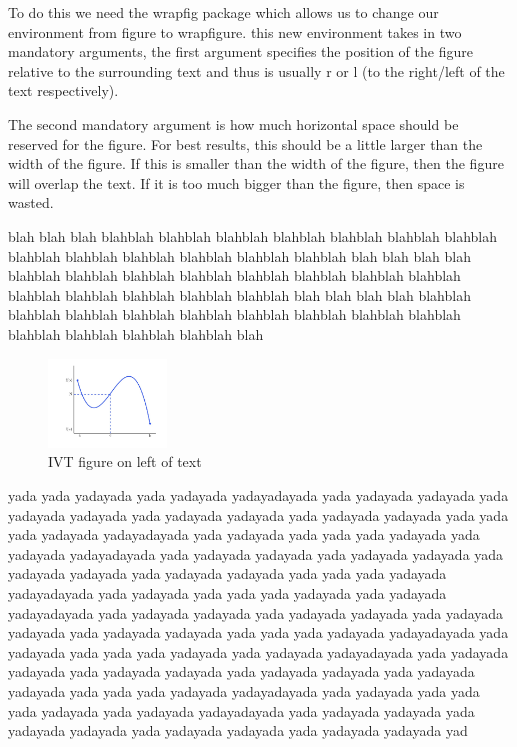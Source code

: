 \documentclass[a4paper,11pt]{article}
\begin{document}
To do this we need the wrapfig package  which allows us to change our environment from figure to wrapfigure. this new environment takes in two mandatory arguments, the first argument specifies the position of the figure relative to the surrounding text and thus is usually r or l (to the right/left of the text respectively).

The second mandatory argument is how much horizontal space should be reserved for the figure. For best results, this should be a little larger than the width of the figure. If this is smaller than the width of the figure, then the figure will overlap the text. If it is too much bigger than the figure, then space is wasted.

blah blah blah blahblah blahblah blahblah blahblah blahblah blahblah blahblah blahblah blahblah blahblah blahblah blahblah blahblah blah
blah blah blah blahblah blahblah blahblah blahblah blahblah blahblah blahblah blahblah blahblah blahblah blahblah blahblah blahblah blah
blah blah blah blahblah blahblah blahblah blahblah blahblah blahblah blahblah blahblah blahblah blahblah blahblah blahblah blahblah blah
%
\begin{figure}
\centering
\includegraphics[width=0.28\textwidth]{ivt}
\caption{IVT figure on left of text}
\label{fig:IVTleft}
\end{figure}
%
yada  yada yadayada yada yadayada yadayadayada yada yadayada yadayada yada yadayada yadayada yada yadayada yadayada yada yadayada yadayada yada  yada  yada yadayada yadayadayada yada yadayada yada yada  yada yadayada yada yadayada yadayadayada yada yadayada yadayada yada yadayada yadayada yada yadayada yadayada yada yadayada yadayada yada  yada  yada yadayada yadayadayada yada yadayada yada yada  yada yadayada yada yadayada yadayadayada yada yadayada yadayada yada yadayada yadayada yada yadayada yadayada yada yadayada yadayada yada  yada  yada yadayada yadayadayada yada yadayada yada yada  yada yadayada yada yadayada yadayadayada yada yadayada yadayada yada yadayada yadayada yada yadayada yadayada yada yadayada yadayada yada  yada  yada yadayada yadayadayada yada yadayada yada yada  yada yadayada yada yadayada yadayadayada yada yadayada yadayada yada yadayada yadayada yada yadayada yadayada yada yadayada yadayada yad
\end{document}
